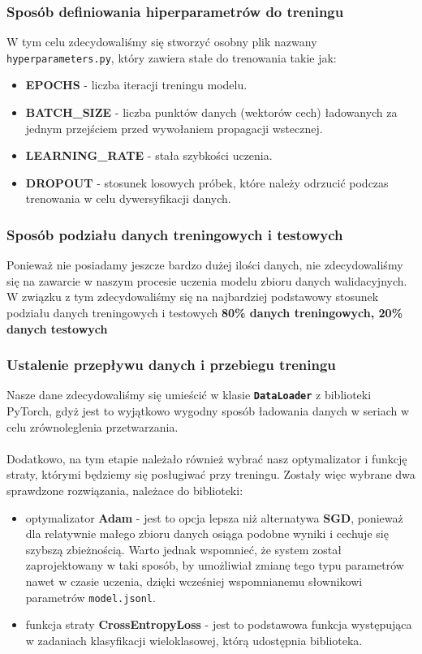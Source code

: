     \subsubsection{Sposób definiowania hiperparametrów do treningu}
    W tym celu zdecydowaliśmy się stworzyć osobny plik nazwany \texttt{hyperparameters.py},
    który zawiera stałe do trenowania takie jak:
    \begin{itemize}
        \item \textbf{EPOCHS} - liczba iteracji treningu modelu.
        \item \textbf{BATCH\_SIZE} - liczba punktów danych (wektorów cech) ładowanych za jednym przejściem
        przed wywołaniem propagacji wstecznej.
        \item \textbf{LEARNING\_RATE} - stała szybkości uczenia.
        \item \textbf{DROPOUT} - stosunek losowych próbek, które należy odrzucić podczas trenowania w celu
        dywersyfikacji danych.
    \end{itemize}
    \subsubsection{Sposób podziału danych treningowych i testowych}
    Ponieważ nie posiadamy jeszcze bardzo dużej ilości danych, nie zdecydowaliśmy się na
    zawarcie w naszym procesie uczenia modelu zbioru danych walidacyjnych. W związku z tym
    zdecydowaliśmy się na najbardziej podstawowy stosunek podziału danych
    treningowych i testowych \textbf{80\% danych treningowych, 20\% danych testowych}

    \subsubsection{Ustalenie przepływu danych i przebiegu treningu}
    Nasze dane zdecydowaliśmy się umieścić w klasie \textbf{\texttt{DataLoader}} z biblioteki
    PyTorch, gdyż jest to wyjątkowo wygodny sposób ładowania danych w seriach w celu zrównoleglenia
    przetwarzania.\\\\
    Dodatkowo, na tym etapie należało również wybrać nasz optymalizator i funkcję straty, którymi
    będziemy się posługiwać przy treningu. Zostały więc wybrane dwa sprawdzone rozwiązania, należace
    do biblioteki:
    \begin{itemize}
        \item optymalizator \textbf{Adam} - jest to opcja lepsza niż alternatywa \textbf{SGD}, ponieważ
        dla relatywnie małego zbioru danych osiąga podobne wyniki i cechuje się szybszą zbieżnością.
        Warto jednak wspomnieć, że system został zaprojektowany w taki sposób, by umożliwiał zmianę
        tego typu parametrów
        nawet w czasie uczenia, dzięki wcześniej wspomnianemu słownikowi parametrów \texttt{model.jsonl}.
        \item funkcja straty \textbf{CrossEntropyLoss} - jest to podstawowa funkcja występująca
        w zadaniach klasyfikacji wieloklasowej, którą udostępnia biblioteka.
    \end{itemize}

